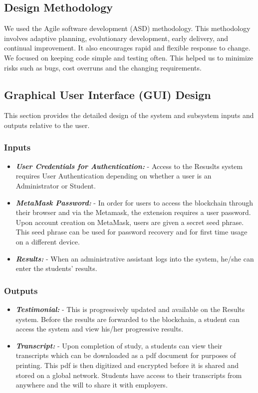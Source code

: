 \subsection{Design Methodology}
We used the Agile software development (ASD) methodology. This methodology involves adaptive planning, evolutionary development, early delivery, and continual improvement. It also encourages rapid and flexible response to change. We focused on keeping code simple and testing often. This helped us to minimize risks such as bugs, cost overruns and the changing requirements.

\subsection{Graphical User Interface (GUI) Design}
This section provides the detailed design of the system and subsystem inputs and outputs relative to the user.

\subsubsection{Inputs}
\begin{itemize}
\item \textbf{\textit{User Credentials for Authentication:}} - Access to the Resuslts system requires User Authentication depending on whether a user is an Administrator or Student. 
\item \textbf{\textit{MetaMask Password:}} - In order for users to access the blockchain through their browser and via the Metamask, the extension requires a user password. Upon account creation on MetaMask, users are given a secret seed phrase. This seed phrase can be used for password recovery and for first time usage on a different device.
\item \textbf{\textit{Results:}} - When an administrative assistant logs into the system, he/she can enter the students’ results.
\end{itemize}

\subsubsection{Outputs}
\begin{itemize}
\item \textbf{\textit{Testimonial:}} - This is progressively updated and available on the Results system. Before the results are forwarded to the blockchain, a student can access the system and view his/her progressive results.
\item \textbf{\textit{Transcript:}} - Upon completion of study, a students can view their transcripts which can be downloaded as a pdf document for purposes of printing. This pdf is then digitized and encrypted before it is shared and stored on a global network. Students have access to their transcripts from anywhere and the will to share it with employers.
\end{itemize}

